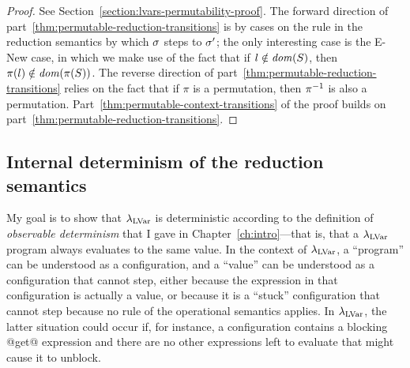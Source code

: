 \LVarsLemPermutability
\begin{proof}
  See Section~\ref{section:lvars-permutability-proof}.  The forward
  direction of part~\ref{thm:permutable-reduction-transitions} is by
  cases on the rule in the reduction semantics by which $\sigma$ steps
  to $\sigma'$; the only interesting case is the {\sc E-New} case, in
  which we make use of the fact that if $l \notin \mathit{dom}(S)$, then
  $\pi(l) \notin \mathit{dom}(\pi(S))$. The reverse direction of
  part~\ref{thm:permutable-reduction-transitions} relies on the fact
  that if $\pi$ is a permutation, then $\pi^{-1}$ is also a permutation.
  Part~\ref{thm:permutable-context-transitions} of the proof builds on
  part~\ref{thm:permutable-reduction-transitions}.
\end{proof}

\subsection{Internal determinism of the reduction semantics}


My goal is to show that $\lambda_{\textrm{LVar}}$ is deterministic according to
the definition of \emph{observable determinism} that I gave in
Chapter~\ref{ch:intro}---that is, that a $\lambda_{\textrm{LVar}}$ program always
evaluates to the same value.  In the context of $\lambda_{\textrm{LVar}}$, a
``program'' can be understood as a configuration, and a ``value'' can
be understood as a configuration that cannot step, either because the
expression in that configuration is actually a value, or because it is
a ``stuck'' configuration that cannot step because no rule of the
operational semantics applies.  In $\lambda_{\textrm{LVar}}$, the latter situation
could occur if, for instance, a configuration contains a blocking
@get@ expression and there are no other expressions left to evaluate
that might cause it to unblock.

